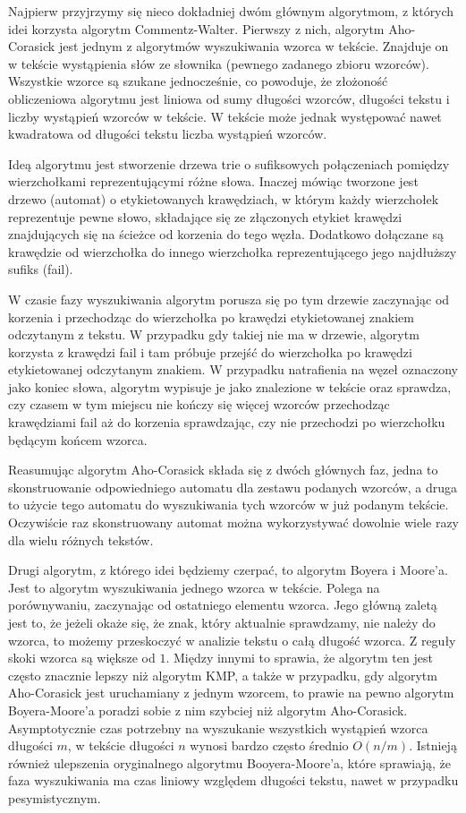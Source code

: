 Najpierw przyjrzymy się nieco dokładniej dwóm głównym algorytmom, z których idei korzysta algorytm Commentz-Walter. Pierwszy z nich, algorytm Aho-Corasick jest jednym z algorytmów wyszukiwania wzorca w tekście. Znajduje on w tekście wystąpienia słów ze słownika (pewnego zadanego zbioru wzorców). Wszystkie wzorce są szukane jednocześnie, co powoduje, że złożoność obliczeniowa algorytmu jest liniowa od sumy długości wzorców, długości tekstu i liczby wystąpień wzorców w tekście. W tekście może jednak występować nawet kwadratowa od długości tekstu liczba wystąpień wzorców. 

Ideą algorytmu jest stworzenie drzewa trie o sufiksowych połączeniach pomiędzy wierzchołkami reprezentującymi różne słowa. Inaczej mówiąc tworzone jest drzewo (automat) o etykietowanych krawędziach, w którym każdy wierzchołek reprezentuje pewne słowo, składające się ze złączonych etykiet krawędzi znajdujących się na ścieżce od korzenia do tego węzła. Dodatkowo dołączane są krawędzie od wierzchołka do innego wierzchołka reprezentującego jego najdłuższy sufiks (fail). 

W czasie fazy wyszukiwania algorytm porusza się po tym drzewie zaczynając od korzenia i przechodząc do wierzchołka po krawędzi etykietowanej znakiem odczytanym z tekstu. W przypadku gdy takiej nie ma w drzewie, algorytm korzysta z krawędzi fail i tam próbuje przejść do wierzchołka po krawędzi etykietowanej odczytanym znakiem. W przypadku natrafienia na węzeł oznaczony jako koniec słowa, algorytm wypisuje je jako znalezione w tekście oraz sprawdza, czy czasem w tym miejscu nie kończy się więcej wzorców przechodząc krawędziami fail aż do korzenia sprawdzając, czy nie przechodzi po wierzchołku będącym końcem wzorca. 

Reasumując algorytm Aho-Corasick składa się z dwóch głównych faz, jedna to skonstruowanie odpowiedniego automatu dla zestawu podanych wzorców, a druga to użycie tego automatu do wyszukiwania tych wzorców w już podanym tekście. Oczywiście raz skonstruowany automat można wykorzystywać dowolnie wiele razy dla wielu różnych tekstów.

Drugi algorytm, z którego idei będziemy czerpać, to algorytm Boyera i Moore'a. Jest to algorytm wyszukiwania jednego wzorca w tekście. Polega na porównywaniu, zaczynając od ostatniego elementu wzorca. Jego główną zaletą jest to, że jeżeli okaże się, że znak, który aktualnie sprawdzamy, nie należy do wzorca, to możemy przeskoczyć w analizie tekstu o całą długość wzorca. Z reguły skoki wzorca są większe od $1$. Między innymi to sprawia, że algorytm ten jest często znacznie lepszy niż algorytm KMP, a także w przypadku, gdy algorytm Aho-Corasick jest uruchamiany z jednym wzorcem, to prawie na pewno algorytm Boyera-Moore'a poradzi sobie z nim szybciej niż algorytm Aho-Corasick. Asymptotycznie czas potrzebny na wyszukanie wszystkich wystąpień wzorca długości $m$, w tekście długości $n$ wynosi bardzo często średnio $O(n/m)$. Istnieją również ulepszenia oryginalnego algorytmu Booyera-Moore'a, które sprawiają, że faza wyszukiwania ma czas liniowy względem długości tekstu, nawet w przypadku pesymistycznym.

